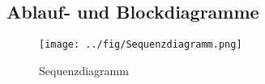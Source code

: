 \subsection{Ablauf- und Blockdiagramme}
\begin{figure}[h!]          
	\centering             
	\texttt{[image: ../fig/Sequenzdiagramm.png]}
	\caption{Sequenzdiagramm}
	\label{fig:Sequenzdiagramm}        
\end{figure}
